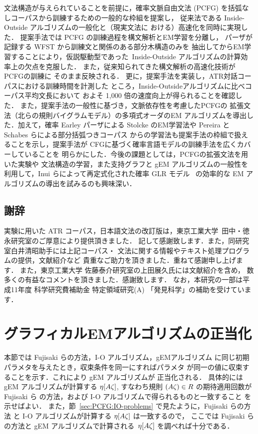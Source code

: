 {文法構造が与えられていることを前提に，確率文脈自由文法 (PCFG)
を括弧なしコーパスから訓練するための一般的な枠組を提案し，
従来法である Inside-Outside アルゴリズムの一般化と（現実文法に
おける）高速化を同時に実現した．
提案手法では PCFG の訓練過程を構文解析とEM学習を分離し，
パーザが記録する WFST から訓練文と関係のある部分木構造のみを
抽出してからEM学習することにより，仮説駆動型であった\
Inside-Outside アルゴリズムの計算効率上の欠点を克服した．
また，従来知られてきた構文解析の高速化技術がPCFGの訓練に
そのまま反映される．
更に，提案手法を実装し，ATR対話コーパスにおける訓練時間を計測した
ところ，Inside-Outsideアルゴリズムに比べコーパス平均文長において
およそ 1,000 倍の速度向上が得られることを確認した．
また，提案手法の一般性に基づき，文脈依存性を考慮したPCFGの
拡張文法（北らの規則バイグラムモデル）の多項式オーダのEM
アルゴリズムを導出した．加えて，確率 Earley パーザによる Stolcke
のEM学習法や Pereira と Schabes らによる部分括弧つきコーパス
からの学習法も提案手法の枠組で扱えることを示し，提案手法が
CFGに基づく確率言語モデルの訓練手法を広くカバーしていることを
明らかにした．今後の課題としては，PCFGの拡張文法を用いた実験や
文法構造の学習，また支持グラフと gEM アルゴリズムの一般性を
利用して，Inui らによって再定式化された確率 GLR モデル~\cite{Inui98}
の効率的な EM アルゴリズムの導出を試みるのも興味深い．


\subsection*{謝辞}

実験に用いた ATR コーパス，日本語文法の改訂版は，東京工業大学\ 
田中・徳永研究室のご厚意により提供頂きました．
記して感謝致します．また，同研究室白井清昭助手には上記コーパス・
文法に関する情報やテキスト処理プログラムの提供，文献紹介など
貴重なご助力を頂きました．重ねて感謝申し上げます．
また，東京工業大学 佐藤泰介研究室の上田展久氏には文献紹介を含め，
数多くの有益なコメントを頂きました．感謝致します．
なお，本研究の一部は平成11年度 科学研究費補助金 特定領域研究(A)
「発見科学」の補助を受けています．




\appendix

\section{グラフィカルEMアルゴリズムの正当化}
\label{sec:GEM-validity}

本節では Fujisaki らの方法，I-O アルゴリズム，gEMアルゴリズム
に同じ初期パラメタを与えたとき，収束条件を同一にすればパラメタ
が同一の値に収束することを示す．これにより gEM アルゴリズムが
正当化される．
具体的には gEM アルゴリズムが計算する $\eta[A\zeta]$,
すなわち規則 $(A\zeta)\in R$ の期待適用回数が Fujisaki ら
の方法，および I-O アルゴリズムで得られるものと一致すること
を示せばよい．
また，節~\ref{sec:PCFG:IO-problems} で見たように，Fujisaki らの方法
と I-O アルゴリズムが計算する $\eta[A\zeta]$ は一致するので，
ここでは Fujisaki らの方法と gEM アルゴリズムで計算される\
$\eta[A\zeta]$ を調べれば十分である．

}
